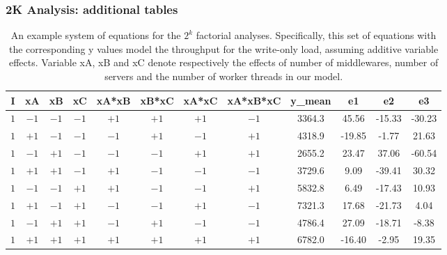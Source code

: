 \documentclass[11pt,a4paper]{article}
\begin{document}
\subsubsection*{2K Analysis: additional tables} \label{sec:app-2k-analysis-add-plots}
\begin{table}[h]
\small
\centering
\begin{tabular}{|c|c|c|c|c|c|c|c|c|c|c|c|}
\hline
I & xA & xB & xC & {\small xA*xB} & {\small xB*xC} & {\small xA*xC} & {\small xA*xB*xC} & y\_mean & e1 & e2 & e3 \\ 
\hline
$1$ & $-1$ & $-1$ & $-1$ & $+1$ & $+1$ & $+1$ & $-1$ & 3364.3 & 45.56 & -15.33 & -30.23 \\
\hline
$1$ & $+1$ & $-1$ & $-1$ & $-1$ & $+1$ & $-1$ & $+1$ & 4318.9 & -19.85 & -1.77 & 21.63 \\
\hline
$1$ & $-1$ & $+1$ & $-1$ & $-1$ & $-1$ & $+1$ & $+1$ & 2655.2 & 23.47 & 37.06 & -60.54 \\
\hline
$1$ & $+1$ & $+1$ & $-1$ & $+1$ & $-1$ & $-1$ & $-1$ & 3729.6 & 9.09 & -39.41 & 30.32 \\
\hline
$1$ & $-1$ & $-1$ & $+1$ & $+1$ & $-1$ & $-1$ & $+1$ & 5832.8 & 6.49 & -17.43 & 10.93 \\
\hline
$1$ & $+1$ & $-1$ & $+1$ & $-1$ & $-1$ & $+1$ & $-1$ & 7321.3 & 17.68 & -21.73 & 4.04 \\
\hline
$1$ & $-1$ & $+1$ & $+1$ & $-1$ & $+1$ & $-1$ & $-1$ & 4786.4 & 27.09 & -18.71 & -8.38 \\
\hline
$1$ & $+1$ & $+1$ & $+1$ & $+1$ & $+1$ & $+1$ & $+1$ & 6782.0 & -16.40 & -2.95 & 19.35 \\
\hline
\end{tabular}
\caption{An example system of equations for the $2^{k}$ factorial analyses. Specifically, this set of equations with the corresponding y values model the throughput for the write-only load, assuming additive variable effects. Variable xA, xB and xC denote respectively the effects of number of middlewares, number of servers and the number of worker threads in our model.} \label{tab:2k-example-table}
\end{table}
\end{document}
